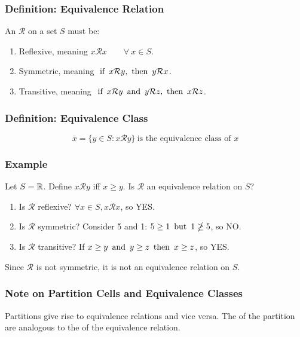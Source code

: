 \subsubsection*{Definition: Equivalence Relation}
An  $\mathcal{R}$ on a set $S$ must be:
\begin{enumerate}
    \item Reflexive, meaning $x\mathcal{R}x \qquad \forall~x \in S$.
    \item Symmetric, meaning $\operatorname{~\text{if}~} x\mathcal{R}y, \operatorname{~\text{then}~} y\mathcal{R}x$.
    \item Transitive, meaning $\operatorname{~\text{if}~} x\mathcal{R}y \operatorname{~\text{and}~} y\mathcal{R}z, \operatorname{~\text{then}~} x\mathcal{R}z$.
\end{enumerate}

\subsubsection*{Definition: Equivalence Class}
\[
    \overline{x} = \{y \in S : x\mathcal{R}y\} ~\text{is the equivalence class of $x$}
\]

\subsubsection*{Example}
Let $S = \mathbb{R}$. Define $x\mathcal{R}y$ iff $x \geq y$. Is $\mathcal{R}$ an equivalence relation on $S$?
\begin{enumerate}
    \item Is $\mathcal{R}$ reflexive? $\forall x \in S, x\mathcal{R}x$, so YES.
    \item Is $\mathcal{R}$ symmetric? Consider 5 and 1: $5 \geq 1 \operatorname{~\text{but}~} 1 \ngeq 5$, so NO.
    \item Is $\mathcal{R}$ transitive? If $x \geq y \operatorname{~\text{and}~} y \geq z \operatorname{~\text{then}~} x \geq z$, so YES.
\end{enumerate}
Since $\mathcal{R}$ is not symmetric, it is not an equivalence relation on $S$.

\subsubsection*{Note on Partition Cells and Equivalence Classes}
Partitions give rise to equivalence relations and vice versa. The  of the partition are analogous to the  of the equivalence relation.